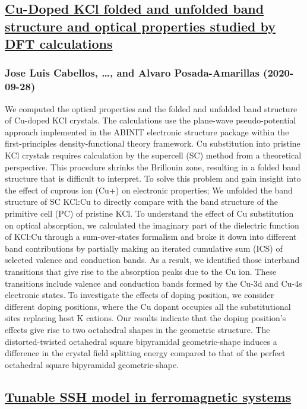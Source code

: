 \subsection*{\href{http://arxiv.org/abs/2009.13041v1}{Cu-Doped KCl folded and unfolded band structure and optical properties  studied by DFT calculations}}
\subsubsection*{Jose Luis Cabellos, \dots, and Alvaro Posada-Amarillas (2020-09-28)}
We computed the optical properties and the folded and unfolded band structure
of Cu-doped KCl crystals. The calculations use the plane-wave pseudo-potential
approach implemented in the ABINIT electronic structure package within the
first-principles density-functional theory framework. Cu substitution into
pristine KCl crystals requires calculation by the supercell (SC) method from a
theoretical perspective. This procedure shrinks the Brillouin zone, resulting
in a folded band structure that is difficult to interpret. To solve this
problem and gain insight into the effect of cuprous ion (Cu+) on electronic
properties; We unfolded the band structure of SC KCl:Cu to directly compare
with the band structure of the primitive cell (PC) of pristine KCl. To
understand the effect of Cu substitution on optical absorption, we calculated
the imaginary part of the dielectric function of KCl:Cu through a
sum-over-states formalism and broke it down into different band contributions
by partially making an iterated cumulative sum (ICS) of selected valence and
conduction bands. As a result, we identified those interband transitions that
give rise to the absorption peaks due to the Cu ion. These transitions include
valence and conduction bands formed by the Cu-3d and Cu-4s electronic states.
To investigate the effects of doping position, we consider different doping
positions, where the Cu dopant occupies all the substitutional sites replacing
host K cations. Our results indicate that the doping position's effects give
rise to two octahedral shapes in the geometric structure. The distorted-twisted
octahedral square bipyramidal geometric-shape induces a difference in the
crystal field splitting energy compared to that of the perfect octahedral
square bipyramidal geometric-shape.

\subsection*{\href{http://arxiv.org/abs/2009.13034v1}{Tunable SSH model in ferromagnetic systems}}
